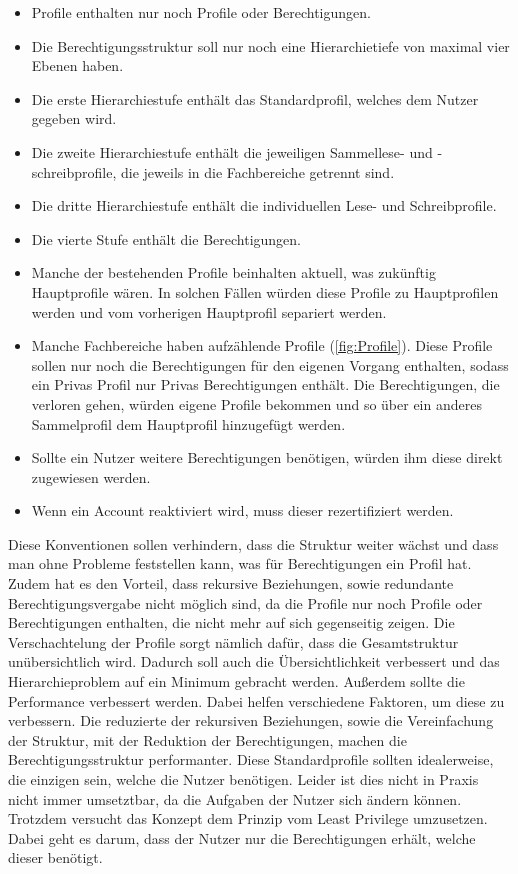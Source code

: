 \begin{itemize}
	\item Profile enthalten nur noch Profile oder Berechtigungen.
	\item Die Berechtigungsstruktur soll nur noch eine Hierarchietiefe von maximal vier Ebenen haben.
	\item Die erste Hierarchiestufe enthält das Standardprofil, welches dem Nutzer gegeben wird.
	\item Die zweite Hierarchiestufe enthält die jeweiligen Sammellese- und -schreibprofile, die jeweils in die Fachbereiche getrennt sind.
	\item Die dritte Hierarchiestufe enthält die individuellen Lese- und Schreibprofile.
	\item Die vierte Stufe enthält die Berechtigungen.
	\item Manche der bestehenden Profile beinhalten aktuell, was zukünftig Hauptprofile wären.
In solchen Fällen würden diese Profile zu Hauptprofilen werden und vom vorherigen Hauptprofil separiert werden.
	\item Manche Fachbereiche haben aufzählende Profile (\ref{fig:Profile}).
Diese Profile sollen nur noch die Berechtigungen für den eigenen Vorgang enthalten, sodass ein Privas Profil nur Privas Berechtigungen enthält.
Die Berechtigungen, die verloren gehen, würden eigene Profile bekommen und so über ein anderes Sammelprofil dem Hauptprofil hinzugefügt werden.
	\item Sollte ein Nutzer weitere Berechtigungen benötigen, würden ihm diese direkt zugewiesen werden.
	\item Wenn ein Account reaktiviert wird, muss dieser rezertifiziert werden.
\end{itemize}
Diese Konventionen sollen verhindern, dass die Struktur weiter wächst und dass man ohne Probleme feststellen kann, was für Berechtigungen ein Profil hat.
Zudem hat es den Vorteil, dass rekursive Beziehungen, sowie redundante Berechtigungsvergabe nicht möglich sind, da die Profile nur noch Profile oder Berechtigungen enthalten, die nicht mehr auf sich gegenseitig zeigen.
Die Verschachtelung der Profile sorgt nämlich dafür, dass die Gesamtstruktur unübersichtlich wird. \cite[21]{RuB}
Dadurch soll auch die Übersichtlichkeit verbessert und das Hierarchieproblem auf ein Minimum gebracht werden.
Außerdem sollte die Performance verbessert werden.
Dabei helfen verschiedene Faktoren, um diese zu verbessern.
Die reduzierte der rekursiven Beziehungen, sowie die Vereinfachung der Struktur, mit der Reduktion der Berechtigungen, machen die Berechtigungsstruktur performanter.
Diese Standardprofile sollten idealerweise, die einzigen sein, welche die Nutzer benötigen. \cite[21]{RuB}
Leider ist dies nicht in Praxis nicht immer umsetztbar, da die Aufgaben der Nutzer sich ändern können.
Trotzdem versucht das Konzept dem Prinzip vom Least Privilege umzusetzen.
Dabei geht es darum, dass der Nutzer nur die Berechtigungen erhält, welche dieser benötigt. \cite[1]{LePr}

